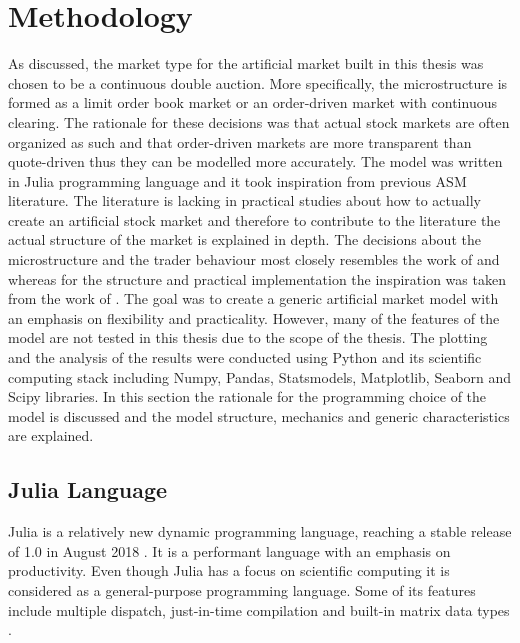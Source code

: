 
\section{Methodology}

As discussed, the market type for the artificial market built in this thesis was chosen 
to be a continuous double auction. More specifically, the microstructure is formed as a 
limit order book market or an order-driven market with continuous clearing. The rationale 
for these decisions was that actual stock markets are often organized as such and that 
order-driven markets are more transparent than quote-driven thus they can be modelled more 
accurately. The model was written in Julia
programming language and it took inspiration from previous ASM literature.
The literature is lacking in practical studies about how to actually create
an artificial stock market and therefore to contribute to the literature %
the actual structure of the market is explained in depth. The decisions 
about the microstructure and the trader behaviour most closely resembles the 
work of \citet{Genoa01} and \citet{Raberto05} whereas for the structure and 
practical implementation the inspiration was taken from the work of \citet{Ben12}. 
The goal was to create a generic artificial market model with an emphasis on flexibility 
and practicality. However, many of the features of the model are not tested in this thesis 
due to the scope of the thesis. The plotting and the analysis of the results were 
conducted using Python and its scientific computing stack including Numpy, Pandas, 
Statsmodels, Matplotlib, Seaborn and Scipy libraries. In this section the rationale 
for the programming choice of the model is discussed and the model structure, 
mechanics and generic characteristics are explained.

\subsection{Julia Language}
Julia is a relatively new dynamic programming language, 
reaching a stable release of 1.0 in August 2018 \citep{JuliaV1}.
It is a performant language with an emphasis
on productivity. Even though Julia has a focus on scientific 
computing it is considered as a general-purpose programming
language. Some of its features include
multiple dispatch, just-in-time compilation and built-in
matrix data types \citep{Julia}.

